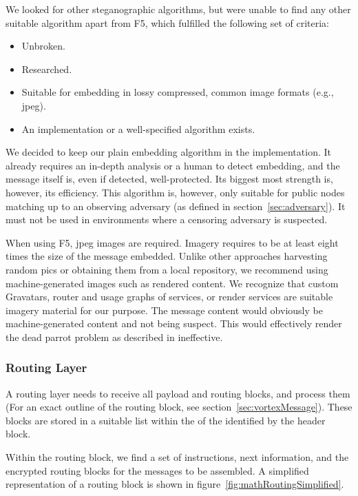We looked for other steganographic algorithms, but were unable to find any other suitable algorithm apart from F5, which fulfilled the following set of criteria:
\begin{itemize}
	\item Unbroken.
	\item Researched.
	\item Suitable for embedding in lossy compressed, common image formats (e.g., jpeg).
	\item An implementation or a well-specified algorithm exists.
\end{itemize}

We decided to keep our plain embedding algorithm in the implementation. It already requires an in-depth analysis or a human to detect embedding, and the message itself is, even if detected, well-protected. Its biggest most strength is, however, its efficiency. This algorithm is, however, only suitable for public nodes matching up to an observing adversary (as defined in section~\ref{sec:adversary}). It must not be used in environments where a censoring adversary is suspected.

When using F5, jpeg images are required. Imagery requires to be at least eight times the size of the message embedded. Unlike other approaches harvesting random pics or obtaining them from a local repository, we recommend using machine-generated images such as rendered content. We recognize that custom Gravatars, router and usage graphs of services, or render services are suitable imagery material for our purpose. The message content would obviously be machine-generated content and not being suspect. This would effectively render the dead parrot problem as described in \cite{oakland2013-parrot} ineffective. 

\subsubsection{Routing Layer\label{sec:routingLayer}}
A routing layer needs to receive all payload and routing blocks, and process them (For an exact outline of the routing block, see section~\ref{sec:vortexMessage}). These blocks are stored in a suitable list within the  of the  identified by the header block.

Within the routing block, we find a set of instructions, next \VortexNodes information, and the encrypted routing blocks for the messages to be assembled. A simplified representation of a routing block is shown in figure~\ref{fig:mathRoutingSimplified}.

